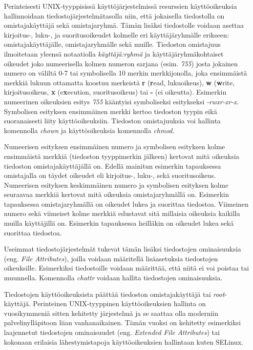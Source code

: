 Perinteisesti UNIX-tyyppisissä käyttöjärjestelmissä resurssien käyttöoikeuksia hallinnoidaan tiedostojärjestelmätasolla niin, että jokaisella tiedostolla on omistajakäyttäjä sekä omistajaryhmä. Tämän lisäksi tiedostolle voidaan asettaa kirjoitus-, luku-, ja suoritusoikeudet kolmelle eri käyttäjäryhmälle erikseen: omistajakäyttäjälle, omistajaryhmälle sekä muille. Tiedoston omistajuus ilmoitetaan yleensä notaatiolla \textit{käyttäjä:ryhmä} ja käyttäjäryhmäkohtaiset oikeudet joko numeerisella kolmen numeron sarjana (esim. \textit{755}) josta jokainen numero on väliltä 0-7 tai symbolisella 10 merkin merkkijonolla, joka ensimmäistä merkkiä lukuun ottamatta koostuu merkeistä \textbf{r} (\textbf{r}ead, lukuoikeus), \textbf{w} (\textbf{w}rite, kirjoitusoikeus, \textbf{x} (e\textbf{x}ecution, suoritusoikeus) tai \textbf{-} (ei oikeutta). Esimerkin numeerinen oikeuksien esitys \textit{755} kääntyisi symboliseksi esitykseksi \textit{-rwxr-xr-x}. Symbolisen esityksen ensimmäinen merkki kertoo tiedoston tyypin eikä suoranaisesti liity käyttöoikeuksiin. Tiedoston omistajuuksia voi hallinta komennolla \textit{chown} ja käyttöoikeuksia komennolla \textit{chmod}.

Numeerisen esityksen ensimmäinen numero ja symbolisen esityksen kolme ensimmäistä merkkiä (tiedoston tyyppimerkin jälkeen) kertovat mitä oikeuksia tiedoston omistajakäyttäjällä on. Edellä mainitun esimerkin tapauksessa omistajalla on täydet oikeudet eli kirjoitus-, luku-, sekä suoritusoikeus. Numeerisen esityksen keskimmäinen numero ja symbolisen esityksen kolme seuraavaa merkkiä kertovat mitä oikeuksia omistajaryhmällä on. Esimerkin tapauksessa omistajaryhmällä on oikeudet lukea ja suorittaa tiedostoa. Viimeinen numero sekä viimeiset kolme merkkiä edustavat sitä millaisia oikeuksia kaikilla muilla käyttäjillä on. Esimerkin tapauksessa heilläkin on oikeudet lukea sekä suorittaa tiedostoa.

Useimmat tiedostojärjestelmät tukevat tämän lisäksi tiedostojen ominaisuuksia (eng. \textit{File Attributes}), joilla voidaan määritellä lisäasetuksia tiedostojen oikeuksille. Esimerkiksi tiedostoille voidaan määrittää, että niitä ei voi poistaa tai muunnella. Komennolla \textit{chattr} voidaan hallita tiedostojen ominaisuuksia.

Tiedostojen käyttöoikeuksista päättää tiedoston omistajakäyttäjä tai \textit{root}-käyttäjä. Perinteinen UNIX-tyyppinen käyttöoikeuksien hallinta on vuosikymmeniä sitten kehitetty järjestelmä ja se saattaa olla moderniin palvelinylläpitoon liian vanhanaikainen. Tämän vuoksi on kehitetty esimerkiksi laajennetut tiedostojen ominaisuudet (eng. \textit{Extended File Attributes}) tai kokonaan erilaisia lähestymistapoja käyttöoikeuksien hallintaan kuten SELinux.~\cite{kalsi2018practical}

